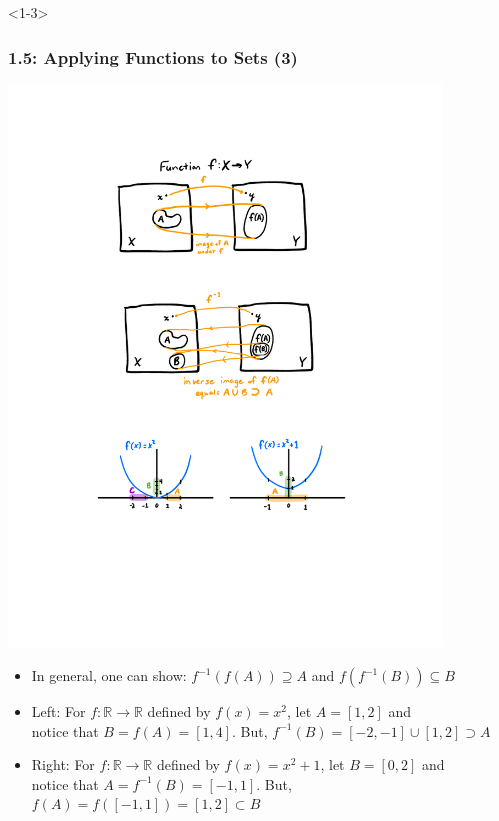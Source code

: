 \documentclass[10pt,english,aspectratio=169]{beamer}
\begin{document}
\begin{frame}<1-3> \frametitle{1.5: Applying Functions to Sets (3)}

\vspace{-2mm}
\begin{center}
\includegraphics[width=115mm]{figures/ch1_set_image_ex}
\end{center}
\vspace{-2mm}

\begin{itemize}
    \setlength\itemsep{3mm}
    \item<1-> In general, one can show: $f^{-1}(f(A)) \supseteq A$ and $f(f^{-1}(B)) \subseteq B$
    \item<2-> Left: For $f \colon \mathbb{R} \rightarrow \mathbb{R}$ defined by $f(x)=x^2$, let $A=[1,2]$ and \\ notice that $B = f(A) = [1,4]$.  But, $f^{-1}(B) = [-2,-1] \cup [1,2] \supset A$
    \item<3-> Right: For $f \colon \mathbb{R} \rightarrow \mathbb{R}$ defined by $f(x)=x^2+1$, let $B=[0,2]$ and \\ notice that $A = f^{-1}(B) = [-1,1]$.  But, $f(A) = f([-1,1]) = [1,2] \subset B$
\end{itemize}
 

 
 \end{frame}  
 
\end{document}

